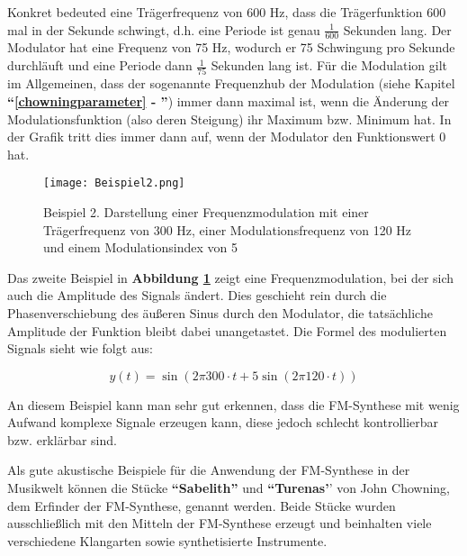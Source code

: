 Konkret bedeuted eine Trägerfrequenz von 600 Hz, dass die Trägerfunktion 600 mal in der Sekunde schwingt, d.h. eine Periode ist genau $\frac{1}{600}$ Sekunden lang. Der Modulator hat eine Frequenz von 75 Hz, wodurch er 75 Schwingung pro Sekunde durchläuft und eine Periode dann $\frac{1}{75}$ Sekunden lang ist. Für die Modulation gilt im Allgemeinen, dass der sogenannte Frequenzhub der Modulation (siehe Kapitel \textbf{``\ref{chowningparameter} - ''}) immer dann maximal ist, wenn die Änderung der Modulationsfunktion (also deren Steigung) ihr Maximum bzw. Minimum hat. In der Grafik tritt dies immer dann auf, wenn der Modulator den Funktionswert 0 hat.

\begin{figure} [ht]
\centering
  \texttt{[image: Beispiel2.png]}
\caption{Beispiel 2. Darstellung einer Frequenzmodulation mit einer Trägerfrequenz von 300 Hz, einer Modulationsfrequenz von 120 Hz und einem Modulationsindex von 5}
\label{fig:beispiel2}
\end{figure}

Das zweite Beispiel in \textbf{Abbildung \ref{fig:beispiel2}} zeigt eine Frequenzmodulation, bei der sich auch die Amplitude des Signals ändert. Dies geschieht rein durch die Phasenverschiebung des äußeren Sinus durch den Modulator, die tatsächliche Amplitude der Funktion bleibt dabei unangetastet. Die Formel des modulierten Signals sieht wie folgt aus:

\begin{equation}
y(t) = \sin(2 \pi 300\cdot t + 5 \sin(2 \pi 120\cdot t))
\end{equation}

An diesem Beispiel kann man sehr gut erkennen, dass die FM-Synthese mit wenig Aufwand komplexe Signale erzeugen kann, diese jedoch schlecht kontrollierbar bzw. erklärbar sind.

Als gute akustische Beispiele für die Anwendung der FM-Synthese in der Musikwelt können die Stücke \textbf{``Sabelith''} und \textbf{``Turenas'}' von John Chowning, dem Erfinder der FM-Synthese, genannt werden. Beide Stücke wurden ausschließlich mit den Mitteln der FM-Synthese erzeugt und beinhalten viele verschiedene Klangarten sowie synthetisierte Instrumente.

\FloatBarrier
